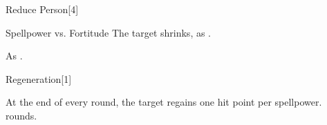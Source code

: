 \begin{spellsection}[Mass]{Reduce Person}[4]
    \begin{spellheader}
    \end{spellheader}
    \begin{spellcontent}
        \begin{spelltargetinginfo}
        \end{spelltargetinginfo}
        \begin{spelleffects}
            \begin{spellattack}{Spellpower vs. Fortitude}
                \spellsuccess The target shrinks, as .
            \end{spellattack}
            \spelldur \durshort \dismissable
        \end{spelleffects}
    \end{spellcontent}
    \begin{spellfooter}
        \spellnotes As .
        \miscastexplode
    \end{spellfooter}
\end{spellsection}

\begin{spellsection}[Lesser]{Regeneration}[1]
    \begin{spellheader}
    \end{spellheader}
    \begin{spellcontent}
        \begin{spelltargetinginfo}
        \end{spelltargetinginfo}
        \begin{spelleffects}
            \spelleffect At the end of every round, the target regains one hit point per spellpower.
             rounds.
        \end{spelleffects}
    \end{spellcontent}
    \begin{spellfooter}
        \miscastexplode
    \end{spellfooter}
\end{spellsection}

